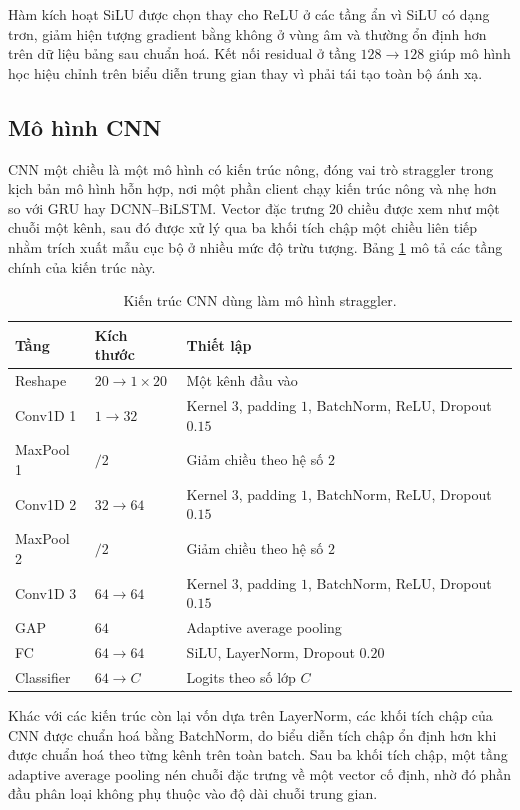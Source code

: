 Hàm kích hoạt SiLU được chọn thay cho ReLU ở các tầng ẩn vì SiLU có dạng trơn, giảm hiện tượng gradient bằng không ở vùng âm và thường ổn định hơn trên dữ liệu bảng sau chuẩn hoá. Kết nối residual ở tầng $128\rightarrow128$ giúp mô hình học hiệu chỉnh trên biểu diễn trung gian thay vì phải tái tạo toàn bộ ánh xạ.

\subsection{Mô hình CNN}

CNN một chiều là một mô hình có kiến trúc nông, đóng vai trò straggler trong kịch bản mô hình hỗn hợp, nơi một phần client chạy kiến trúc nông và nhẹ hơn so với GRU hay DCNN--BiLSTM. Vector đặc trưng $20$ chiều được xem như một chuỗi một kênh, sau đó được xử lý qua ba khối tích chập một chiều liên tiếp nhằm trích xuất mẫu cục bộ ở nhiều mức độ trừu tượng. Bảng \ref{tab:cnn_arch} mô tả các tầng chính của kiến trúc này.

\begin{table}[H]
\centering
\caption{Kiến trúc CNN dùng làm mô hình straggler.}
\label{tab:cnn_arch}
\begin{tabular}{lll}
\hline
Tầng & Kích thước & Thiết lập \\
\hline
Reshape & $20\rightarrow1\times20$ & Một kênh đầu vào \\
Conv1D 1 & $1\rightarrow32$ & Kernel $3$, padding $1$, BatchNorm, ReLU, Dropout $0.15$ \\
MaxPool 1 & $/2$ & Giảm chiều theo hệ số $2$ \\
Conv1D 2 & $32\rightarrow64$ & Kernel $3$, padding $1$, BatchNorm, ReLU, Dropout $0.15$ \\
MaxPool 2 & $/2$ & Giảm chiều theo hệ số $2$ \\
Conv1D 3 & $64\rightarrow64$ & Kernel $3$, padding $1$, BatchNorm, ReLU, Dropout $0.15$ \\
GAP & $64$ & Adaptive average pooling \\
FC & $64\rightarrow64$ & SiLU, LayerNorm, Dropout $0.20$ \\
Classifier & $64\rightarrow C$ & Logits theo số lớp $C$ \\
\hline
\end{tabular}
\end{table}

Khác với các kiến trúc còn lại vốn dựa trên LayerNorm, các khối tích chập của CNN được chuẩn hoá bằng BatchNorm, do biểu diễn tích chập ổn định hơn khi được chuẩn hoá theo từng kênh trên toàn batch. Sau ba khối tích chập, một tầng adaptive average pooling nén chuỗi đặc trưng về một vector cố định, nhờ đó phần đầu phân loại không phụ thuộc vào độ dài chuỗi trung gian.

